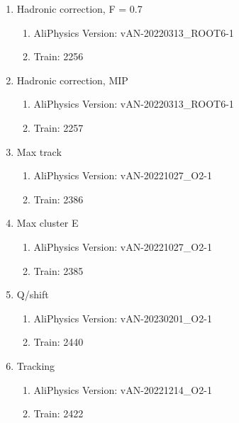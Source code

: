\begin{enumerate}
\begin{enumerate}
    \end{enumerate}
    \item Hadronic correction, F = 0.7
    \begin{enumerate}
        \item AliPhysics Version: vAN-20220313\_ROOT6-1
        \item Train: 2256
    \end{enumerate}
    \item Hadronic correction, MIP
    \begin{enumerate}
        \item AliPhysics Version: vAN-20220313\_ROOT6-1
        \item Train: 2257
    \end{enumerate}
    \item Max track \pT
    \begin{enumerate}
        \item AliPhysics Version: vAN-20221027\_O2-1
        \item Train: 2386
    \end{enumerate}
    \item Max cluster E
    \begin{enumerate}
        \item AliPhysics Version: vAN-20221027\_O2-1
        \item Train: 2385
    \end{enumerate}
    \item Q/\pT shift
    \begin{enumerate}
        \item AliPhysics Version: vAN-20230201\_O2-1
        \item Train: 2440
    \end{enumerate}
    \item Tracking
    \begin{enumerate}
        \item AliPhysics Version: vAN-20221214\_O2-1
        \item Train: 2422
    \end{enumerate}
\end{enumerate}

